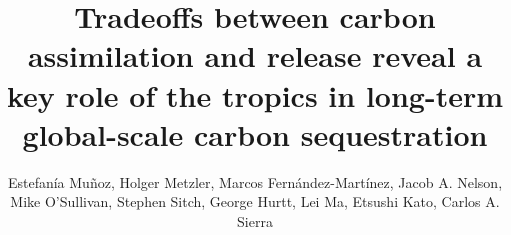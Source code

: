 \documentclass[9pt,twoside]{pnas-new}
\begin{document}
\renewcommand{\thesection}{S\arabic{section}}


\title{Tradeoffs between carbon assimilation and release reveal a key role of the tropics in long-term global-scale carbon sequestration}



\author[a]{Estefanía Muñoz, Holger Metzler, Marcos Fernández-Martínez, Jacob A. Nelson, Mike O'Sullivan, Stephen Sitch, George Hurtt, Lei Ma, Etsushi Kato, Carlos A. Sierra}








\maketitle
\thispagestyle{firststyle}


\end{document}
